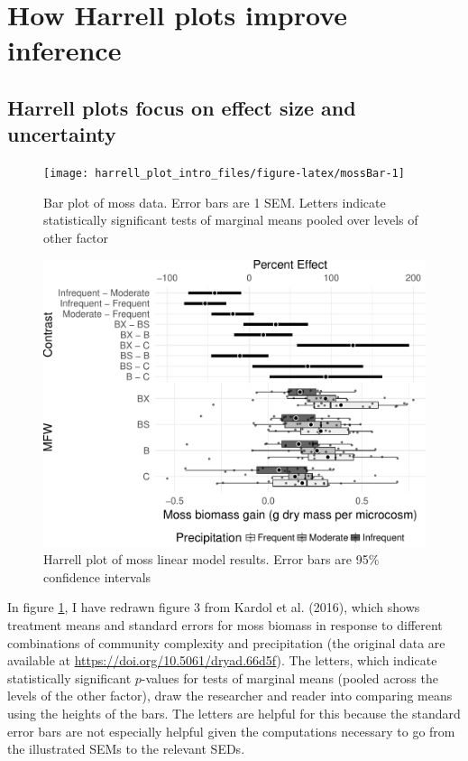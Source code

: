\documentclass[fleqn,10pt,lineno]{wlpeerj} %
\theoremstyle{definition}
\theoremstyle{definition}
\theoremstyle{definition}
\theoremstyle{remark}
\begin{document}
\section*{How Harrell plots improve
inference}\label{how-harrell-plots-improve-inference}

\subsection*{Harrell plots focus on effect size and
uncertainty}\label{harrell-plots-focus-on-effect-size-and-uncertainty}

\begin{figure}
\texttt{[image: harrell\_plot\_intro\_files/figure-latex/mossBar-1]} \caption{Bar plot of moss data. Error bars are 1 SEM. Letters indicate statistically significant tests of marginal means pooled over levels of other factor}\label{fig:mossBar}
\end{figure}

\begin{figure}
\includegraphics[width=0.9\linewidth]{../output/moss_Hplot} \caption{Harrell plot of moss linear model results. Error bars are 95\% confidence intervals}\label{fig:mossHarrell}
\end{figure}

In figure \ref{fig:mossBar}, I have redrawn figure 3 from Kardol et al.
(2016), which shows treatment means and standard errors for moss biomass
in response to different combinations of community complexity and
precipitation (the original data are available at
\url{https://doi.org/10.5061/dryad.66d5f}). The letters, which indicate
statistically significant \(p\)-values for tests of marginal means
(pooled across the levels of the other factor), draw the researcher and
reader into comparing means using the heights of the bars. The letters
are helpful for this because the standard error bars are not especially
helpful given the computations necessary to go from the illustrated SEMs
to the relevant SEDs.
\end{document}
